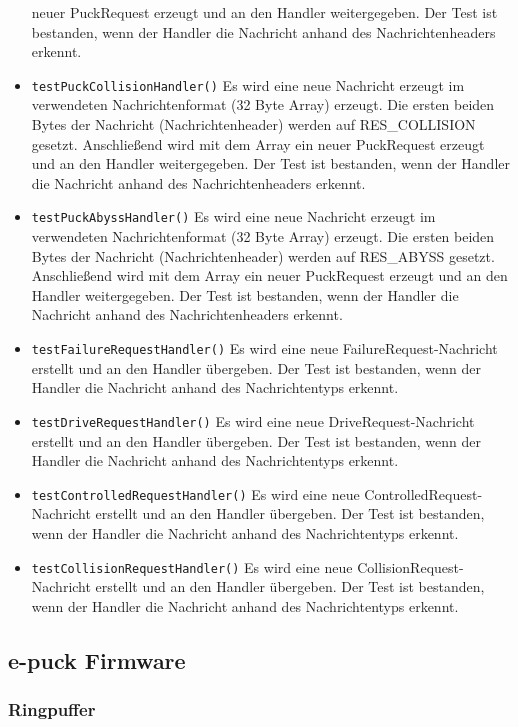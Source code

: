 \documentclass[10pt,a4paper]{article}
\begin{document}
\begin{itemize}
				neuer PuckRequest erzeugt und an den Handler weitergegeben.
				Der Test ist bestanden, wenn der Handler die Nachricht anhand des Nachrichtenheaders erkennt.
				\item \texttt{testPuckCollisionHandler()} Es wird eine neue Nachricht erzeugt im verwendeten Nachrichtenformat (32 Byte Array)
				erzeugt. Die ersten beiden Bytes der Nachricht (Nachrichtenheader) werden auf RES\_COLLISION gesetzt. Anschließend wird mit dem Array
				ein neuer PuckRequest erzeugt und an den Handler weitergegeben.
				Der Test ist bestanden, wenn der Handler die Nachricht anhand des Nachrichtenheaders erkennt.
				\item \texttt{testPuckAbyssHandler()} Es wird eine neue Nachricht erzeugt im verwendeten Nachrichtenformat (32 Byte Array) erzeugt.
				Die ersten beiden Bytes der Nachricht (Nachrichtenheader) werden auf RES\_ABYSS gesetzt. Anschließend wird mit dem Array ein
				neuer PuckRequest erzeugt und an den Handler weitergegeben.
				Der Test ist bestanden, wenn der Handler die Nachricht anhand des Nachrichtenheaders erkennt.
				\item \texttt{testFailureRequestHandler()} Es wird eine neue FailureRequest-Nachricht erstellt und an den Handler übergeben. Der Test
				ist bestanden, wenn der Handler die Nachricht anhand des Nachrichtentyps erkennt.
				\item \texttt{testDriveRequestHandler()} Es wird eine neue DriveRequest-Nachricht erstellt und an den Handler übergeben. Der Test
				ist bestanden, wenn der Handler die Nachricht anhand des Nachrichtentyps erkennt.
				\item \texttt{testControlledRequestHandler()} Es wird eine neue ControlledRequest-Nachricht erstellt und an den Handler übergeben.
				Der Test ist bestanden, wenn der Handler die Nachricht anhand des Nachrichtentyps erkennt.
				\item \texttt{testCollisionRequestHandler()} Es wird eine neue CollisionRequest-Nachricht erstellt und an den Handler übergeben. Der
				Test ist bestanden, wenn der Handler die Nachricht anhand des Nachrichtentyps erkennt.
			\end{itemize}
		
		\subsection{e-puck Firmware}
		
			\subsubsection{Ringpuffer}
	
\end{document}

